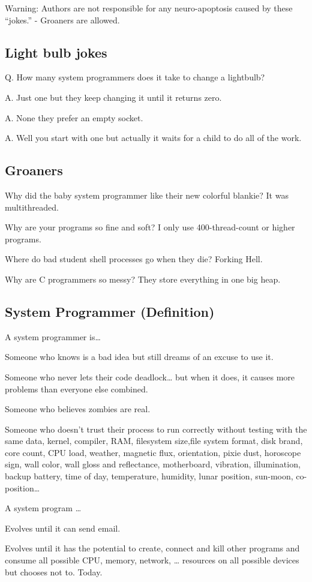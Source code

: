 
Warning: Authors are not responsible for any neuro-apoptosis caused by these ``jokes.'' - Groaners are allowed.

\subsection{Light bulb jokes}

Q. How many system programmers does it take to change a lightbulb?

A. Just one but they keep changing it until it returns zero.

A. None they prefer an empty socket.

A. Well you start with one but actually it waits for a child to do all of the work.

\subsection{Groaners}

Why did the baby system programmer like their new colorful blankie? It was multithreaded.

Why are your programs so fine and soft? I only use 400-thread-count or higher programs.

Where do bad student shell processes go when they die? Forking Hell.

Why are C programmers so messy? They store everything in one big heap.

\subsection{System Programmer (Definition)}

A system programmer is\ldots{}

Someone who knows  is a bad idea but still dreams of an excuse to use it.

Someone who never lets their code deadlock\ldots{} but when it does, it causes more problems than everyone else combined.

Someone who believes zombies are real.

Someone who doesn't trust their process to run correctly without testing with the same data, kernel, compiler, RAM, filesystem size,file system format, disk brand, core count, CPU load, weather, magnetic flux, orientation, pixie dust, horoscope sign, wall color, wall gloss and reflectance, motherboard, vibration, illumination, backup battery, time of day, temperature, humidity, lunar position, sun-moon, co-position\ldots{}

A system program \ldots{}

Evolves until it can send email.

Evolves until it has the potential to create, connect and kill other programs and consume all possible CPU, memory, network, \ldots{} resources on all possible devices but chooses not to. Today.
